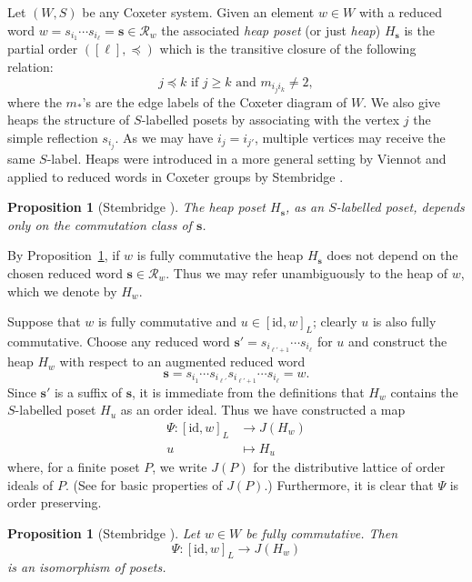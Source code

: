 \documentclass{amsart}
\newcommand{\mc}{\mathcal}
\newcommand{\bs}{\boldsymbol}
\newcommand{\id}{\mathrm{id}}
\newtheorem{prop}[theorem]{Proposition}
\theoremstyle{definition}
\theoremstyle{remark}
\begin{document}
Let $(W,S)$ be any Coxeter system. Given an element $w \in W$ with a reduced word $w=s_{i_1} \cdots s_{i_{\ell}}=\bs{s} \in \mc{R}_w$ the associated \emph{heap poset} (or just \emph{heap}) $H_{\bs{s}}$ is the partial order $([\ell], \preceq)$ which is the transitive closure of the following relation:
\[
j \preceq k \text{ if $j \geq k$ and $m_{i_j i_k} \neq 2$},
\]
where the $m_*$'s are the edge labels of the Coxeter diagram of $W$.  We also give heaps the structure of $S$-labelled posets by associating with the vertex $j$ the simple reflection $s_{i_j}$.  As we may have $i_j=i_{j'}$, multiple vertices may receive the same $S$-label.  Heaps were introduced in a more general setting by Viennot \cite{Viennot} and applied to reduced words in Coxeter groups by Stembridge \cite{Stembridge}.

\begin{prop}[Stembridge \cite{Stembridge}]
\label{prop:heap-depend-on-commutation-class}
The heap poset $H_{\bs{s}}$, as an $S$-labelled poset, depends only on the commutation class of $\bs{s}$.
\end{prop}

By Proposition~\ref{prop:heap-depend-on-commutation-class}, if $w$ is fully commutative the heap $H_{\bs{s}}$ does not depend on the chosen reduced word $\bs{s} \in \mc{R}_w$.  Thus we may refer unambiguously to the heap of $w$, which we denote by $H_w$.

Suppose that $w$ is fully commutative and $u \in [\id,w]_L$; clearly $u$ is also fully commutative.  Choose any reduced word $\bs{s'}=s_{i_{\ell'+1}} \cdots s_{i_{\ell}}$ for $u$ and construct the heap $H_w$ with respect to an augmented reduced word
\[
\bs{s}=s_{i_1} \cdots s_{i_{\ell'}} s_{i_{\ell'+1}} \cdots s_{i_{\ell}}=w.
\]
Since $\bs{s'}$ is a suffix of $\bs{s}$, it is immediate from the definitions that $H_w$ contains the $S$-labelled poset $H_u$ as an order ideal.  Thus we have constructed a map
\begin{align*}
\Psi: [\id,w]_L &\to J(H_w) \\
u & \mapsto H_u
\end{align*}
where, for a finite poset $P$, we write $J(P)$ for the distributive lattice of order ideals of $P$. (See \cite[\S 3.4]{ec1} for basic properties of $J(P)$.)  Furthermore, it is clear that $\Psi$ is order preserving.

\begin{prop}[Stembridge \cite{Stembridge}]
\label{prop:weak-order-interval-from-heap}
Let $w \in W$ be fully commutative. Then
\[
\Psi: [\id,w]_L \to J(H_w)
\]
is an isomorphism of posets.
\end{prop}
\end{document}
